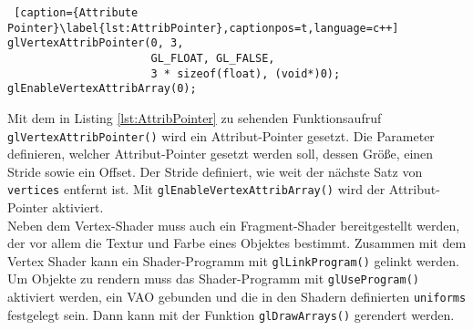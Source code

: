 \documentclass[11pt,a4paper]{article}
\begin{document}
\begin{lstlisting} [caption={Attribute Pointer}\label{lst:AttribPointer},captionpos=t,language=c++]
glVertexAttribPointer(0, 3,
                      GL_FLOAT, GL_FALSE,
                      3 * sizeof(float), (void*)0);
glEnableVertexAttribArray(0);
\end{lstlisting}
\noindent
Mit dem in Listing \ref{lst:AttribPointer} zu sehenden Funktionsaufruf \lstinline!glVertexAttribPointer()! wird ein Attribut-Pointer gesetzt. Die Parameter definieren, welcher Attribut-Pointer gesetzt werden soll, dessen Größe, einen Stride sowie ein Offset. Der Stride definiert, wie weit der nächste Satz von \lstinline!vertices! entfernt ist. Mit \lstinline!glEnableVertexAttribArray()! wird der Attribut-Pointer aktiviert.\\
Neben dem Vertex-Shader muss auch ein Fragment-Shader bereitgestellt werden, der vor allem die Textur und Farbe eines Objektes bestimmt. Zusammen mit dem Vertex Shader kann ein Shader-Programm mit \lstinline!glLinkProgram()! gelinkt werden.\\
Um Objekte zu rendern muss das Shader-Programm mit \lstinline!glUseProgram()! aktiviert werden, ein VAO gebunden und die in den Shadern definierten \lstinline!uniforms! festgelegt sein. Dann kann mit der Funktion \lstinline!glDrawArrays()! gerendert werden.
\end{document}
